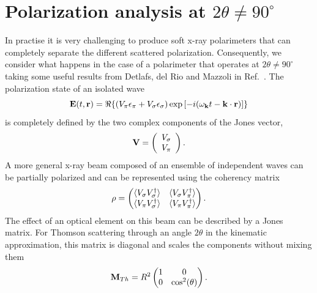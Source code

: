 \documentclass[aps,onecolumn, notitlepage, longbibliography]{revtex4-1}
\begin{document}
\section{Polarization analysis at $2\theta \neq 90^\circ$ }
In practise it is very challenging to produce soft x-ray polarimeters that can completely separate  the different scattered polarization. Consequently, we consider what happens in the case of a polarimeter that operates at $2\theta \neq 90^\circ$ taking some useful results from Detlafs, del Rio and Mazzoli in Ref.~\cite{Detlefs2012}. The polarization state of an isolated wave
\begin{equation}
        {\bf E}(t, {\bf r})
        = \Re \{
                \left(V_{\pi} \epsilon_{\pi} 
                + V_{\sigma} \epsilon_{\sigma}\right)
        \exp \left[ -i(\omega_{\bf k} t - {\bf k}\cdot{\bf r}) \right]
        \}
        \label{el_field}
\end{equation}
is completely defined by the two complex components of the Jones vector,
\begin{equation}
{\bf V} = \left(\begin{array}{c}V_\sigma\\V_\pi\end{array}\right). \end{equation}
A more general x-ray beam composed of an ensemble of independent waves can be partially polarized and can be represented using the coherency matrix
\begin{equation}
{\bf \rho} = 
  \begin{pmatrix}
    \langle V_{\sigma}V_{\sigma}^{\dagger} \rangle  & \langle V_{\sigma}V_{\pi}^{\dagger} \rangle \\
    \langle V_{\pi}V_{\sigma}^{\dagger} \rangle &  \langle V_{\pi}V_{\pi}^{\dagger} \rangle
  \end{pmatrix} .
\end{equation}
The effect of an optical element on this beam can be described by a Jones matrix. For Thomson scattering through an angle $2\theta$ in the kinematic approximation, this matrix is diagonal and scales the components without mixing them
\begin{equation}
{\bf M}_{Th} = R^2
  \begin{pmatrix}
    1  & 0  \\
    0 &  \cos^2(\theta)
  \end{pmatrix} .
\end{equation}
\end{document}
